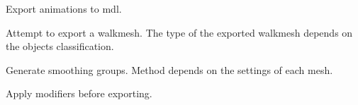 \begin{description}[leftmargin=12em,style=nextline]
    \item[Export Animations] Export animations to mdl.
    \item[Export Walkmesh] Attempt to export a walkmesh. The type of the exported walkmesh depends on the objects classification.
    \item[Export Smooth Groups] Generate smoothing groups. Method depends on the settings of each mesh.
    \item[Apply Modifiers] Apply modifiers before exporting.
\end{description}
